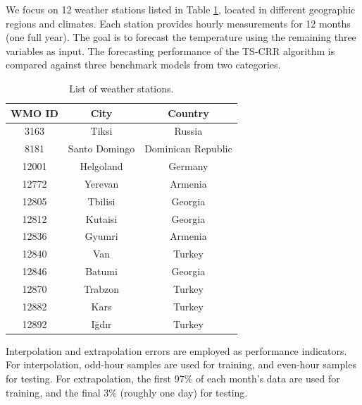 \documentclass[smallextended,referee,envcountsect,,numbers]{svjour3}
\begin{document}
We focus on 12 weather stations listed in Table \ref{station_list}, located in different geographic regions and climates. Each station provides hourly measurements for 12 months (one full year). The goal is to forecast the temperature using the remaining three variables as input. The forecasting performance of the TS-CRR algorithm is compared against three benchmark models from two categories.
\begin{table}[h!]
\centering
\caption{List of weather stations.
\label{station_list}}
\begin{tabular}{|c|c|c|}
\hline
WMO ID & City & Country \\ \hline
3163 & Tiksi & Russia \\
8181 & Santo Domingo & Dominican Republic \\
12001 & Helgoland & Germany \\
12772 & Yerevan & Armenia \\
12805 & Tbilisi & Georgia \\
12812 & Kutaisi & Georgia \\
12836 & Gyumri & Armenia \\
12840 & Van & Turkey \\
12846 & Batumi & Georgia \\
12870 & Trabzon & Turkey \\
12882 & Kars & Turkey \\
12892 & Iğdır & Turkey \\ \hline
\end{tabular}
\end{table}
Interpolation and extrapolation errors are employed as performance indicators. For interpolation, odd-hour samples are used for training, and even-hour samples for testing. For extrapolation, the first 97\% of each month's data are used for training, and the final 3\% (roughly one day) for testing.
\end{document}

